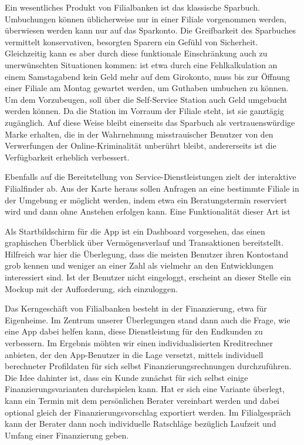     Ein wesentliches Produkt von Filialbanken ist das klassische Sparbuch. Umbuchungen können üblicherweise nur in einer Filiale vorgenommen werden, überwiesen werden kann nur auf das Sparkonto. Die Greifbarkeit des Sparbuches vermittelt konservativen, besorgten Sparern ein Gefühl von Sicherheit. Gleichzeitig kann es aber durch diese funktionale Einschränkung auch zu unerwünschten Situationen kommen: ist etwa durch eine Fehlkalkulation an einem Samstagabend kein Geld mehr auf dem Girokonto, muss bis zur Öffnung einer Filiale am Montag gewartet werden, um Guthaben umbuchen zu können. Um dem Vorzubeugen, soll über die Self-Service Station auch Geld umgebucht werden können. Da die Station im Vorraum der Filiale steht, ist sie ganztägig zugänglich. Auf diese Weise bleibt einerseits das Sparbuch als vertrauenswürdige Marke erhalten, die in der Wahrnehmung misstrauischer Benutzer von den Verwerfungen der Online-Kriminalität unberührt bleibt, andererseits ist die Verfügbarkeit erheblich verbessert.
    
    Ebenfalls auf die Bereitstellung von Service-Dienstleistungen zielt der interaktive Filialfinder ab. Aus der Karte heraus sollen Anfragen an eine bestimmte Filiale in der Umgebung er möglicht werden, indem etwa ein Beratungstermin reserviert wird und dann ohne Anstehen erfolgen kann. Eine Funktionalität dieser Art ist 
      
    Als Startbildschirm für die App ist ein Dashboard vorgesehen, das einen graphischen Überblick über Vermögensverlauf und Transaktionen bereitstellt. Hilfreich war hier die Überlegung, dass die meisten Benutzer ihren Kontostand grob kennen und weniger an einer Zahl als vielmehr an den Entwicklungen interessiert sind. Ist der Benutzer nicht eingeloggt, erscheint an dieser Stelle ein Mockup mit der Aufforderung, sich einzuloggen.
    
    Das Kerngeschäft von Filialbanken besteht in der Finanzierung, etwa für Eigenheime. Im Zentrum unserer Überlegungen stand dann auch die Frage, wie eine App dabei helfen kann, diese Dienstleistung für den Endkunden zu verbessern. Im Ergebnis möhten wir einen individualisierten Kreditrechner anbieten, der den App-Benutzer in die Lage versetzt, mittels individuell berechneter Profildaten für sich selbst Finanzierungsrechnungen durchzuführen. Die Idee dahinter ist, dass ein Kunde zunächst für sich selbst einige Finanzierungsvarianten durchspielen kann. Hat er sich eine Variante überlegt, kann ein Termin mit dem persönlichen Berater vereinbart werden und dabei optional gleich der Finanzierungsvorschlag exportiert werden. Im Filialgespräch kann der Berater dann noch individuelle Ratschläge bezüglich Laufzeit und Umfang einer Finanzierung geben.
    
